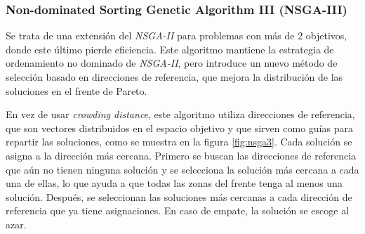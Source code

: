 \subsubsection{Non-dominated Sorting Genetic Algorithm III (NSGA-III)}
\label{ch:nsga3}

Se trata de una extensión del \textit{NSGA-II} para problemas con más de 2 objetivos, donde este último pierde eficiencia. Este algoritmo mantiene la estrategia de ordenamiento no dominado de \textit{NSGA-II}, pero introduce un nuevo método de selección basado en direcciones de referencia, que mejora la distribución de las soluciones en el frente de Pareto.

En vez de usar \textit{crowding distance}, este algoritmo utiliza direcciones de referencia, que son vectores distribuidos en el espacio objetivo y que sirven como guías para repartir las soluciones, como se muestra en la figura \ref{fig:nsga3}. Cada solución se asigna a la dirección más cercana. Primero se buscan las direcciones de referencia que aún no tienen ninguna solución y se selecciona la solución más cercana a cada una de ellas, lo que ayuda a que todas las zonas del frente tenga al menos una solución. Después, se seleccionan las soluciones más cercanas a cada dirección de referencia que ya tiene asignaciones. En caso de empate, la solución se escoge al azar.

